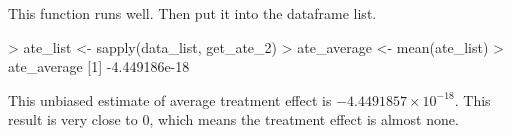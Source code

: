 \documentclass[
]{article}
\newenvironment{Shaded}{\begin{snugshade}}{\end{snugshade}}
\newcommand{\CommentTok}[1]{\textcolor[rgb]{0.56,0.35,0.01}{\textit{#1}}}
\newcommand{\ControlFlowTok}[1]{\textcolor[rgb]{0.13,0.29,0.53}{\textbf{#1}}}
\newcommand{\DecValTok}[1]{\textcolor[rgb]{0.00,0.00,0.81}{#1}}
\newcommand{\FloatTok}[1]{\textcolor[rgb]{0.00,0.00,0.81}{#1}}
\newcommand{\FunctionTok}[1]{\textcolor[rgb]{0.00,0.00,0.00}{#1}}
\newcommand{\NormalTok}[1]{#1}
\newcommand{\OtherTok}[1]{\textcolor[rgb]{0.56,0.35,0.01}{#1}}
\newcommand{\SpecialCharTok}[1]{\textcolor[rgb]{0.00,0.00,0.00}{#1}}
\begin{document}
\begin{Shaded}
\end{Shaded}

This function runs well. Then put it into the dataframe list.

\begin{Shaded}
\begin{Highlighting}[]
\SpecialCharTok{\textgreater{}}\NormalTok{ ate\_list }\OtherTok{\textless{}{-}} \FunctionTok{sapply}\NormalTok{(data\_list, get\_ate\_2)}
\SpecialCharTok{\textgreater{}}\NormalTok{ ate\_average }\OtherTok{\textless{}{-}} \FunctionTok{mean}\NormalTok{(ate\_list)}
\SpecialCharTok{\textgreater{}}\NormalTok{ ate\_average}
\NormalTok{[}\DecValTok{1}\NormalTok{] }\SpecialCharTok{{-}}\FloatTok{4.449186e{-}18}
\end{Highlighting}
\end{Shaded}

This unbiased estimate of average treatment effect is
\ensuremath{-4.4491857\times 10^{-18}}. This result is very close to 0,
which means the treatment effect is almost none.
\end{document}
